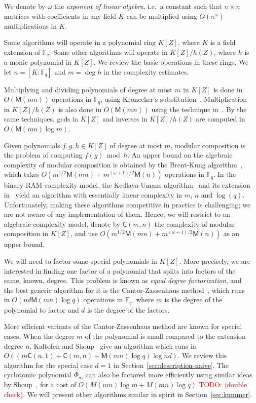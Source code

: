 \documentclass[12pt]{article}
\theoremstyle{plain}
\theoremstyle{definition}
\newcommand{\todo}[1]{\textcolor{red}{TODO: #1}}
\def\F{\ensuremath{\mathbb{F}}}
\def\MM{\ensuremath{\mathsf{M}}}
\def\CC{\ensuremath{\mathsf{C}}}
\newcounter{algorithm}
\begin{document}
We denote by $\omega$ the \emph{exponent of linear algebra}, i.e.\ a
constant such that $n\times n$ matrices with coefficients in any field
$K$ can be multiplied using $O(n^\omega)$ multiplications in $K$.

Some algorithms will operate in a polynomial ring $K[Z]$, where $K$ is
a field extension of $\F_q$. Some other algorithms will operate in
$K[Z]/h(Z)$, where $h$ is a monic polynomial in $K[Z]$. We review the
basic operations in these rings. We let $n=[K:\F_q]$ and $m=\deg h$ in
the complexity estimates.

Multiplying and dividing polynomials of degree at most $m$ in $K[Z]$
is done in $O(\MM(mn))$ operations in $\F_q$, using Kronecker's
substitution~\cite{moenck76,kaltofen87,vzGG,vzgathen+shoup92,harvey09}.
Multiplication in $K[Z]/h(Z)$ is also done in $O(\MM(mn))$ using the
technique in~\cite{pascal+schost06}. By the same techniques, gcds in
$K[Z]$ and inverses in $K[Z]/h(Z)$ are computed in $O(\MM(mn)\log m)$.

Given polynomials $f,g,h\in K[Z]$ of degree at most $m$, modular
composition is the problem of computing $f(g) \bmod h$. An upper bound
on the algebraic complexity of modular composition is obtained by the
Brent-Kung algorithm~\cite{brent+kung}, which takes $O(m^{1/2}\MM(mn)
+ m^{(\omega+1)/2}\MM(n))$ operations in $\F_q$.  In the binary RAM
complexity model, the Kedlaya-Umans algorithm~\cite{KeUm11} and its
extension in~\cite{PoSc13a} yield an algorithm with essentially linear
complexity in $m$, $n$ and $\log(q)$. Unfortunately, making these
algorithms competitive in practice is challenging; we are not aware of
any implementation of them. Hence, we will restrict to an algebraic
complexity model, denote by $\CC(m,n)$ the complexity of modular
composition in $K[Z]$, and use $O(m^{1/2}\MM(mn) +
m^{(\omega+1)/2}\MM(n))$ as an upper bound.

We will need to factor some special polynomials in $K[Z]$. More
precisely, we are interested in finding one factor of a polynomial
that splits into factors of the same, known, degree. This problem is
known as \emph{equal degree factorization}, and the best generic
algorithm for it is the Cantor-Zassenhaus method~\cite{cantor1981},
which runs in $O(nd\MM(mn)\log q)$ operations in $\F_q$, where $m$ is
the degree of the polynomial to factor and $d$ is the degree of the
factors.

More efficient variants of the Cantor-Zassenhaus method are known for
special cases. When the degree $m$ of the polynomial is small compared
to the extension degree $n$, Kaltofen and
Shoup~\cite{kaltofen+shoup97} give an algorithm which runs in
$O((m\CC(n,1) + \CC(m,n) + \MM(mn)\log q)\log nd)$. We review this
algorithm for the special case $d=1$ in
Section~\ref{sec:description-naive}. The cyclotomic polynomial
$\Phi_m$ can also be factored more efficiently using similar ideas by
Shoup~\cite{shoup94}, for a cost of $O(M(mn)\log m + M(mn)\log q)$
\todo{(double check)}. We will present other algorithms similar in
spirit in Section~\ref{sec:kummer}.
\end{document}
